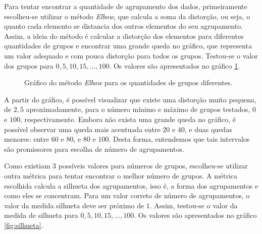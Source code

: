 \documentclass[conference]{IEEEtran}
\begin{document}
Para tentar encontrar a quantidade de agrupamento dos dados, primeiramente escolheu-se utilizar o método \emph{Elbow}, que calcula a soma da distorção, ou seja, o quanto cada elemento se distancia dos outros elementos do seu agrupamento. Assim, a ideia do método é calcular a distorção dos elementos para diferentes quantidades de grupos e encontrar uma grande queda no gráfico, que representa um valor adequado e com pouca distorção para todos os grupos. Testou-se o valor dos grupos para $0, 5, 10, 15, ..., 100$. Os valores são apresentados no gráfico \ref{fig:elbow}.

\begin{figure}[!h]
	\centering
	{
	}
	\caption{\small Gráfico do método \emph{Elbow} para os quantidades de grupos diferentes.}
	\label{fig:elbow}
\end{figure}

A partir do gráfico, é possível visualizar que existe uma distorção muito pequena, de $2,5$ aproximadamente, para o número mínimo e máximo de grupos testados, $0$ e $100$, respectivamente. Embora não exista uma grande queda no gráfico, é possível observar uma queda mais acentuada entre $20$ e $40$, e duas quedas menores: entre $60$ e $80$, e $80$ e $100$. Desta forma, entendemos que tais intervalos são promissores para escolha de número de agrupamentos.

Como existiam 3 possíveis valores para números de grupos, escolheu-se utilizar outra métrica para tentar encontrar o melhor número de grupos. A métrica escolhida calcula a silhueta dos agrupamentos, isso é, a forma dos agrupamentos e como eles se concentram. Para um valor correto de número de agrupamentos, o valor da medida silhueta deve ser próximo de $1$. Assim, testou-se o valor da medida de silhueta para $0, 5, 10, 15, ..., 100$. Os valores são apresentados no gráfico \ref{fig:silhueta}.
\end{document}

